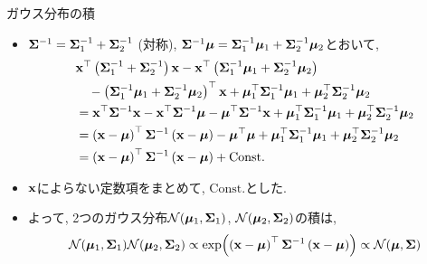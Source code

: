 \documentclass[dvipdfmx,notheorems,t]{beamer}
\begin{document}
\begin{frame}{ガウス分布の積}
\begin{itemize}
  \item $\vb{\Sigma}^{-1} = \vb{\Sigma}_1^{-1} + \vb{\Sigma}_2^{-1}$ (対称),
  $\vb{\Sigma}^{-1} \vb*{\mu} = \vb{\Sigma}_1^{-1} \vb*{\mu}_1 + \vb{\Sigma}_2^{-1} \vb*{\mu}_2$とおいて,
  \begin{align*}
    & \vb{x}^\top \left( \vb{\Sigma}_1^{-1} + \vb{\Sigma}_2^{-1} \right) \vb{x}
      - \vb{x}^\top \left( \vb{\Sigma}_1^{-1} \vb*{\mu}_1 + \vb{\Sigma}_2^{-1} \vb*{\mu}_2 \right) \\
    & \quad - \left( \vb{\Sigma}_1^{-1} \vb*{\mu}_1 + \vb{\Sigma}_2^{-1} \vb*{\mu}_2 \right)^\top \vb{x}
      + \vb*{\mu}_1^\top \vb{\Sigma}_1^{-1} \vb*{\mu}_1
      + \vb*{\mu}_2^\top \vb{\Sigma}_2^{-1} \vb*{\mu}_2 \\
    &= \vb{x}^\top \vb{\Sigma}^{-1} \vb{x}
      - \vb{x}^\top \vb{\Sigma}^{-1} \vb*{\mu}
      - \vb*{\mu}^\top \vb{\Sigma}^{-1} \vb{x}
      + \vb*{\mu}_1^\top \vb{\Sigma}_1^{-1} \vb*{\mu}_1
      + \vb*{\mu}_2^\top \vb{\Sigma}_2^{-1} \vb*{\mu}_2 \\
    &= \left( \vb{x} - \vb*{\mu} \right)^\top \vb{\Sigma}^{-1} \left( \vb{x} - \vb*{\mu} \right)
      - \vb*{\mu}^\top \vb*{\mu}
      + \vb*{\mu}_1^\top \vb{\Sigma}_1^{-1} \vb*{\mu}_1
      + \vb*{\mu}_2^\top \vb{\Sigma}_2^{-1} \vb*{\mu}_2 \\
    &= \left( \vb{x} - \vb*{\mu} \right)^\top \vb{\Sigma}^{-1} \left( \vb{x} - \vb*{\mu} \right)
      + \mathrm{Const.}
  \end{align*}
  \item $\vb{x}$によらない定数項をまとめて, $\mathrm{Const.}$とした.
  \item よって, 2つのガウス分布$\mathcal{N}(\vb*{\mu}_1, \vb{\Sigma}_1)$,
  $\mathcal{N}(\vb*{\mu}_2, \vb{\Sigma}_2)$の積は,
  \begin{align*}
    \mathcal{N}(\vb*{\mu}_1, \vb{\Sigma}_1) \mathcal{N}(\vb*{\mu}_2, \vb{\Sigma}_2)
    \propto \exp(\left( \vb{x} - \vb*{\mu} \right)^\top \vb{\Sigma}^{-1} \left( \vb{x} - \vb*{\mu} \right))
    \propto \mathcal{N}(\vb*{\mu}, \vb{\Sigma})
  \end{align*}
\end{itemize}
\end{frame}
\end{document}
